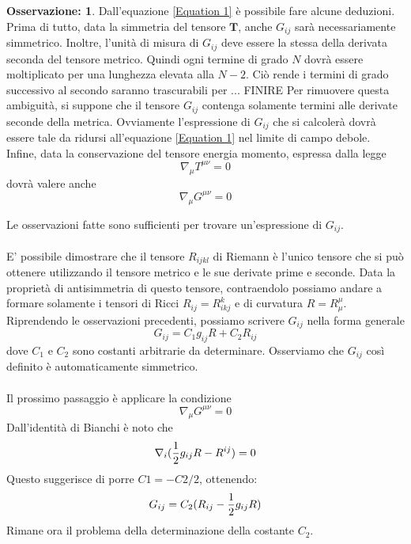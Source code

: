 \documentclass[]{report}
\theoremstyle{definition}
\theoremstyle{Theorem}
\theoremstyle{definition}
\theoremstyle{definition}
\theoremstyle{definition}
\newtheorem{Obs}[Def]{Osservazione:}
\begin{document}
\begin{Obs}
	Dall'equazione \ref{Equation 1} è possibile fare alcune deduzioni. Prima di tutto, data la simmetria del tensore $\textbf{T}$, anche $G_{ij}$ sarà necessariamente simmetrico. Inoltre, l'unità di misura di $G_{ij}$ deve essere la stessa della derivata seconda del tensore metrico. Quindi ogni termine di grado $N$ dovrà essere moltiplicato per una lunghezza elevata alla $N-2$. Ciò rende i termini di grado successivo al secondo saranno trascurabili per ... FINIRE
	Per rimuovere questa ambiguità, si suppone che il tensore $G_{ij}$ contenga solamente termini alle derivate seconde della metrica. Ovviamente l'espressione di $G_{ij}$ che si calcolerà dovrà essere tale da ridursi all'equazione \ref{Equation 1} nel limite di campo debole.\\
	Infine, data la conservazione del tensore energia momento, espressa dalla legge 
	$$\nabla_\mu T^{\mu\nu}=0$$
	dovrà valere anche 
	$$\nabla_\mu G^{\mu\nu}=0$$
\end{Obs}
Le osservazioni fatte sono sufficienti per trovare un'espressione di $G_{ij}$.\\
\\
E' possibile dimostrare che il tensore $R_{ijkl}$ di Riemann è l'unico tensore che si può ottenere utilizzando il tensore metrico e le sue derivate prime e seconde. Data la proprietà di antisimmetria di questo tensore, contraendolo possiamo andare a formare solamente i tensori di Ricci $R_{ij}=R^k_{ikj}$ e di curvatura $R=R^\mu_\mu$. Riprendendo le osservazioni precedenti, possiamo scrivere $G_{ij}$ nella forma generale
$$G_{ij}=C_1g_{ij}R+C_2R_{ij}$$
dove $C_1$ e $C_2$ sono costanti arbitrarie da determinare.
Osserviamo che $G_{ij}$ così definito è automaticamente simmetrico.\\
\\
Il prossimo passaggio è applicare la condizione $$\nabla_\mu G^{\mu\nu}=0$$
Dall'identità di Bianchi è noto che
$$\nabla_i({1\over 2}g_{ij}R-R^{ij})=0$$
Questo suggerisce di porre $C1=-C2/2$, ottenendo:
$$G_{ij}=C_2(R_{ij}-{1\over 2}g_{ij}R)$$
Rimane ora il problema della determinazione della costante $C_2$.
\end{document}
